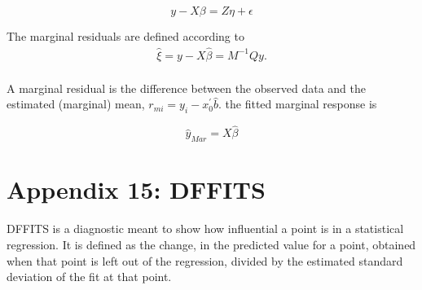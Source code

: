 \documentclass[12pt, a4paper]{report}
\theoremstyle{plain}
\theoremstyle{definition}
\theoremstyle{remark}
\begin{document}
	\[y - X\beta = Z \eta +\epsilon \]
	
	
	The marginal residuals are defined according to
	\begin{eqnarray*}
		\hat{\xi} = y - X\hat{\beta} = M^{-1}Qy. \\\nonumber
	\end{eqnarray*}
	
	A marginal residual is the difference between the observed data and the estimated (marginal) mean, $r_{mi} = y_i - x_0^{\prime} \hat{b}$. 
	the fitted marginal response is
	
	
	\[ \hat{y}_{Mar} = X \hat{\beta} \]

\section*{Appendix 15: DFFITS}%
DFFITS is a diagnostic meant to show how influential a point is in a statistical regression. It is defined as the change, in the predicted value for a point, obtained when that point is left out of the regression, divided by the estimated standard deviation of the fit at that point.	




\end{document}
